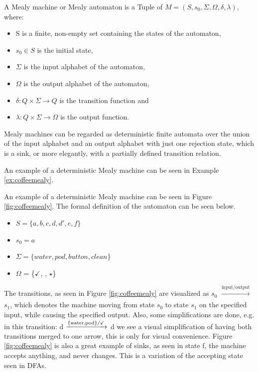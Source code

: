 \begin{definition}
	A Mealy machine or Mealy automaton is a Tuple of $ M=(S,s_{0},\Sigma,\Omega,\delta,\lambda) $, where:
	\begin{itemize}
		\item S is a finite, non-empty set containing the states of the automaton,
		\item $s_{0} \in S$ is the initial state,
		\item $\Sigma$ is the input alphabet of the automaton,
		\item $\Omega$ is the output alphabet of the automaton,
		\item $\delta: Q\times \Sigma \to Q$ is the transition function and
		\item $\lambda: Q\times \Sigma \to \Omega$ is the output function. 
	\end{itemize}
\end{definition}

Mealy machines can be regarded as deterministic finite automata over the union of the input alphabet and an output alphabet with just one rejection state, which is a sink, or more elegantly, with a partially defined transition relation.\cite{Steffen2011}

An example of a deterministic Mealy machine can be seen in Example \ref{ex:coffeemealy}.

\begin{example}
	\label{ex:coffeemealy}
	An example of a deterministic Mealy machine can be seen in Figure \ref{fig:coffeemealy}. The formal definition of the automaton can be seen below.
	\begin{itemize} 
		\item $S = \{a, b, c, d, d', e, f\}$ 
		\item $s_0 = a$
		\item $\Sigma = \{water, pod, button, clean\}$
		\item $\Omega$ = \{$\checkmark$, \Coffeecup, $\star$\}
	\end{itemize}
	The transitions, as seen in Figure \ref{fig:coffeemealy} are visualized as $s_0$ $\xrightarrow[]{\text{input/output}}$ $s_1$, which denotes the machine moving from state $s_0$ to state $s_1$ on the specified input, while causing the specified output. Also, some simplifications are done, e.g. in this transition: d $\xrightarrow[]{\text{\{water,pod\}/\checkmark}}$ d we see a visual simplification of having both transitions merged to one arrow, this is only for visual convenience. Figure \ref{fig:coffeemealy} is also a great example of sinks, as seen in state f, the machine accepts anything, and never changes. This is a variation of the accepting state seen in DFAs.
\end{example}


